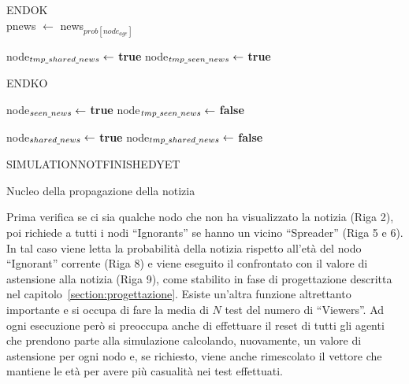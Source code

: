 \begin{algorithm}
 \begin{algorithmic}[1]
	\State \Return END\smuscore OK
      \Else 
	  \\
	  
	    \State p\smuscore news $\gets$ news$_{prob[node_{age}]}$
	    
	      \State node$_{tmp\underline{\hspace{1mm}} shared\underline{\hspace{1mm}} news} \gets$ \textbf{true}
	    \EndIf
	    \State node$_{tmp\underline{\hspace{1mm}} seen\underline{\hspace{1mm}} news} \gets$ \textbf{true}
	    
	  \EndIf
	\EndFor
	  \State \Return END\smuscore KO
	\EndIf
	
	  \State node$_{seen\underline{\hspace{1mm}} news} \gets$ \textbf{true}
	  \State node$_{tmp\underline{\hspace{1mm}} seen\underline{\hspace{1mm}} news} \gets$ \textbf{false}
	\EndFor
	
	  \State node$_{shared\underline{\hspace{1mm}} news} \gets$ \textbf{true}
	  \State node$_{tmp\underline{\hspace{1mm}} shared\underline{\hspace{1mm}} news} \gets$ \textbf{false}
	\EndFor
      
	\State \Return SIMULATION\smuscore NOT\smuscore FINISHED\smuscore YET
      \EndIf
    \EndProcedure
 \end{algorithmic}
 
 \caption{Nucleo della propagazione della notizia}
 \label{alg:core_spread}
\end{algorithm}

Prima verifica se ci sia qualche nodo che non ha visualizzato la notizia (Riga 2), 
poi richiede a tutti i nodi ``Ignorants'' se hanno un vicino ``Spreader'' (Riga 5 e 6). 
In tal caso viene letta la probabilità della notizia rispetto all'età del nodo ``Ignorant'' corrente (Riga 8) e viene eseguito il 
confrontato con il valore di astensione alla notizia (Riga 9), come stabilito in fase di progettazione descritta nel capitolo~\ref{section:progettazione}. 
Esiste un'altra funzione altrettanto importante e si occupa di fare la media di $N$ test del numero di ``Viewers''.
Ad ogni esecuzione però si preoccupa anche di effettuare il reset di tutti gli agenti che prendono parte alla simulazione 
calcolando, nuovamente, un valore di astensione per ogni nodo e, se richiesto, viene anche rimescolato il 
vettore che mantiene le età per avere più casualità nei test effettuati.


